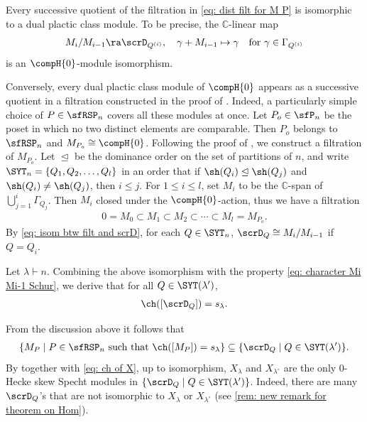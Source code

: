 \documentclass[12pt, reqno]{amsart}
\theoremstyle{plain}
\theoremstyle{definition}
\numberwithin{equation}{section}
\numberwithin{figure}{section}
\numberwithin{table}{section}
\def\C{\mathbb C}
\begin{document}
Every successive quotient of the filtration in \cref{eq: dist filt for M P} is isomorphic to a dual plactic class module.
To be precise, the $\C$-linear map 
\begin{align}\label{eq: isom btw filt and scrD}
M_i/M_{i-1} \ra \scrD_{Q^{(i)}}, \quad\gamma + M_{i-1} \mapsto \gamma \quad\text{for $\gamma \in \Gamma_{Q^{(i)}}$}
\end{align}
is an $\compH{0}$-module isomorphism.


Conversely, every dual plactic class module of $\compH{0}$ appears as a successive quotient in a filtration constructed in the proof of \cite[Theorem~6.7]{23KLO}. Indeed, a particularly simple choice of $P \in \sfRSP_n$ covers all these modules at once.
Let $P_o \in \sfP_n$ be the poset in which no two distinct elements are comparable.
Then $P_o$ belongs to $\sfRSP_n$ and 
$M_{P_o} \cong \compH{0}$.
Following the proof of \cite[Theorem~6.7]{23KLO}, we construct a filtration of $M_{P_o}$.
Let $\trianglelefteq$ be the dominance order on the set of partitions of  $n$, and write $\SYT_n= \{Q_1, Q_2, \ldots, Q_l\}$ 
in an order that
if $\sh(Q_i) \trianglelefteq \sh(Q_j)$ and $\sh(Q_i) \ne \sh(Q_j)$, then $i \le j$.
For $1 \le i \le l$, set $M_i$ to be the $\C$-span of $\bigcup_{j=1}^i\Gamma_{Q_j}$.
Then $M_i$ closed under the $\compH{0}$-action, thus we have a filtration
\begin{align}\label{eq: regular rep of 0 Hecke and its dist filt}
0=M_0 \subset M_1 \subset M_2 \subset \cdots \subset M_l= M_{P_o}.
\end{align}
By \cref{eq: isom btw filt and scrD},
for each $Q \in \SYT_n$, $\scrD_{Q} \cong M_i/M_{i-1}$ if $Q = Q_i$.

Let $\lambda \vdash n$.
Combining the above isomorphism with the property \cref{eq: character Mi Mi-1 Schur}, we derive that for all $Q \in \SYT(\lambda')$,
\begin{align}\label{eq: ch of D Q}
\ch([\scrD_{Q}]) = s_{\lambda}.
\end{align}

From the discussion above  it follows that 
\begin{align}\label{eq: MP set in DQ set}
\{M_P \mid P \in \sfRSP_n \text{ such that $\ch([M_P]) = s_{\lambda}$} \} \subseteq
\{\scrD_Q \mid Q \in \SYT(\lambda') \}. 
\end{align}
By \cite[Theorem 2.2]{05W} together with \cref{eq: ch of X}, up to isomorphism, $X_{\lambda}$ and $X_{\lambda^\circ}$ are the only $0$-Hecke skew Specht modules in   $\{\scrD_Q \mid Q \in \SYT(\lambda')\}$.
Indeed, there are many $\scrD_Q$'s that are not isomorphic to $X_{\lambda}$ or $X_{\lambda^\circ}$ (see \cref{rem: new remark for theorem on Hom}).
\end{document}

